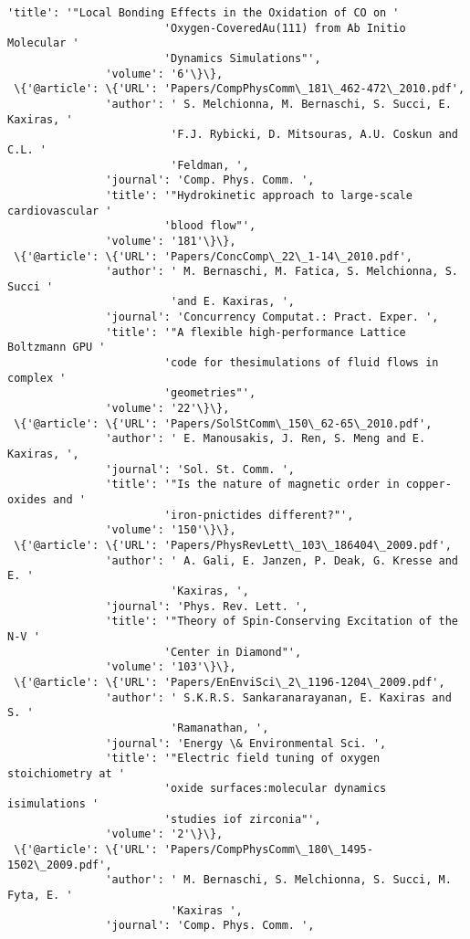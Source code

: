 \documentclass[11pt]{article}
\begin{document}
\begin{Verbatim}[commandchars=\\\{\}]
               'title': '"Local Bonding Effects in the Oxidation of CO on '
                        'Oxygen-CoveredAu(111) from Ab Initio Molecular '
                        'Dynamics Simulations"',
               'volume': '6'\}\},
 \{'@article': \{'URL': 'Papers/CompPhysComm\_181\_462-472\_2010.pdf',
               'author': ' S. Melchionna, M. Bernaschi, S. Succi, E. Kaxiras, '
                         'F.J. Rybicki, D. Mitsouras, A.U. Coskun and C.L. '
                         'Feldman, ',
               'journal': 'Comp. Phys. Comm. ',
               'title': '"Hydrokinetic approach to large-scale cardiovascular '
                        'blood flow"',
               'volume': '181'\}\},
 \{'@article': \{'URL': 'Papers/ConcComp\_22\_1-14\_2010.pdf',
               'author': ' M. Bernaschi, M. Fatica, S. Melchionna, S. Succi '
                         'and E. Kaxiras, ',
               'journal': 'Concurrency Computat.: Pract. Exper. ',
               'title': '"A flexible high-performance Lattice Boltzmann GPU '
                        'code for thesimulations of fluid flows in complex '
                        'geometries"',
               'volume': '22'\}\},
 \{'@article': \{'URL': 'Papers/SolStComm\_150\_62-65\_2010.pdf',
               'author': ' E. Manousakis, J. Ren, S. Meng and E. Kaxiras, ',
               'journal': 'Sol. St. Comm. ',
               'title': '"Is the nature of magnetic order in copper-oxides and '
                        'iron-pnictides different?"',
               'volume': '150'\}\},
 \{'@article': \{'URL': 'Papers/PhysRevLett\_103\_186404\_2009.pdf',
               'author': ' A. Gali, E. Janzen, P. Deak, G. Kresse and E. '
                         'Kaxiras, ',
               'journal': 'Phys. Rev. Lett. ',
               'title': '"Theory of Spin-Conserving Excitation of the N-V '
                        'Center in Diamond"',
               'volume': '103'\}\},
 \{'@article': \{'URL': 'Papers/EnEnviSci\_2\_1196-1204\_2009.pdf',
               'author': ' S.K.R.S. Sankaranarayanan, E. Kaxiras and S. '
                         'Ramanathan, ',
               'journal': 'Energy \& Environmental Sci. ',
               'title': '"Electric field tuning of oxygen stoichiometry at '
                        'oxide surfaces:molecular dynamics isimulations '
                        'studies iof zirconia"',
               'volume': '2'\}\},
 \{'@article': \{'URL': 'Papers/CompPhysComm\_180\_1495-1502\_2009.pdf',
               'author': ' M. Bernaschi, S. Melchionna, S. Succi, M. Fyta, E. '
                         'Kaxiras ',
               'journal': 'Comp. Phys. Comm. ',

\end{Verbatim}
\end{document}
